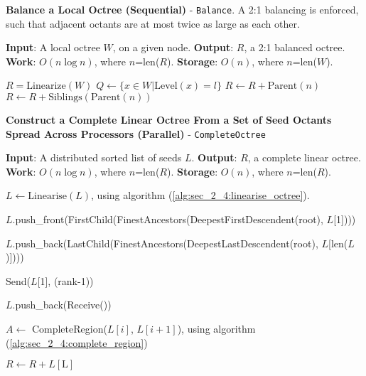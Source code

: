 \begin{algorithm}
    \caption{\textbf{Balance a Local Octree (Sequential)} - \texttt{Balance}. A 2:1 balancing is enforced, such that adjacent octants are at most twice as large as each other.}
    \label{alg:sec_2_4:balance_octree}
    \begin{algorithmic}
        \STATE \textbf{Input}: A local octree $W$, on a given node.
        \STATE \textbf{Output}: $R$, a 2:1 balanced octree. 
        \STATE \textbf{Work}: $O(n \log n)$, where $n$=len($R$).
        \STATE \textbf{Storage}: $O(n)$, where $n$=len($W$).

        \STATE $R = \text{Linearize}(W)$
            \STATE $Q \gets \{ x \in W | \text{Level}(x) = l \}$
                        \STATE $R \gets R + \text{Parent}(n)$
                        \STATE $R \gets R + \text{Siblings}(\text{Parent}(n))$
                    \ENDIF
                \ENDFOR
            \ENDFOR
        \ENDFOR
    \end{algorithmic}
\end{algorithm}

\begin{algorithm}
    \caption{\textbf{Construct a Complete Linear Octree From a Set of Seed Octants Spread Across Processors (Parallel)} - \texttt{CompleteOctree}}
    \label{alg:sec_2_4:complete_octree}
    \begin{algorithmic}
        \STATE \textbf{Input}: A distributed sorted list of seeds $L$.
        \STATE \textbf{Output}: $R$, a complete linear octree. 
        \STATE \textbf{Work}: $O(n \log n)$, where $n$=len($R$).
        \STATE \textbf{Storage}: $O(n)$, where $n$=len($R$).

        \STATE $L \gets \text{Linearise}(L)$, using algorithm (\ref{alg:sec_2_4:linearise_octree}).

            \STATE $L$.push\_front(FirstChild(FinestAncestors(DeepestFirstDescendent(root), $L$[1])))
        \ENDIF
        
            \STATE $L$.push\_back(LastChild(FinestAncestors(DeepestLastDescendent(root), $L$[len($L$)])))
        \ENDIF

            \STATE Send($L$[1], (rank-1))
        \ENDIF

            \STATE $L$.push\_back(Receive())
        \ENDIF

            \STATE $A \gets$ CompleteRegion($L[i]$, $L[i+1]$), using algorithm (\ref{alg:sec_2_4:complete_region})
        \ENDFOR
        
            \STATE $R \gets R+L[\text{L}]$
        \ENDIF

    \end{algorithmic}
\end{algorithm}

